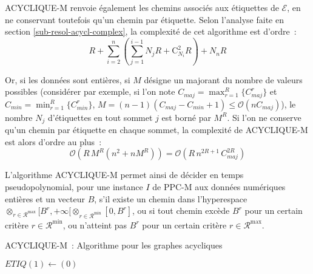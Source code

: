 \documentclass[10pt,francais]{llncs}
\begin{document}
{ACYCLIQUE-M  renvoie \'egalement les chemins associ\'es aux \'etiquettes de $\mathscr{E}$, en ne conservant toutefois qu'un chemin par \'etiquette. Selon l'analyse faite en section \ref{sub-resol-acycl-complex}, la complexit\'e de cet algorithme est d'ordre~: 
$$R + \sum_{i=2}^n \left(\sum_{j=1}^{i-1} N_j R + \textrm{C}^2_{N_i} R \right) + N_n R$$

Or, si les donn\'ees sont enti\`eres, si $M$ d\'esigne un majorant du nombre de valeurs possibles 
(consid\'erer par exemple, si l'on note $C_{maj}= \max_{r=1}^R \{C^r_{maj}\}$ et $C_{min}=\min_{r=1}^R \{C^r_{min}\}$, $M=(n-1)(C_{maj}-C_{min}+1)\leq \mathcal{O}(nC_{maj})$), le nombre $N_j$ d'\'etiquettes en tout sommet $j$ est born\'e par $M^R$. Si l'on ne conserve qu'un chemin par \'etiquette en chaque sommet, la complexit\'e de ACYCLIQUE-M est alors d'ordre au plus~:
$$\mathcal{O}\left(R\,M^R\left(n^2+nM^R\right)\right) = 
\mathcal{O}\left( R\, n^{2R+1}\, C_{maj}^{2R} \right)$$

L'algorithme ACYCLIQUE-M permet ainsi de d\'ecider en temps pseudopolynomial, pour une instance $I$ de PPC-M aux donn\'ees num\'eriques enti\`eres et un vecteur $B$, s'il existe un chemin dans l'hyperespace  
$\otimes_{r\in \mathscr{R}^{\max}}[B^r,+\infty[\otimes_{r\in \mathscr{R}^{\min}}[0,B^r]$, ou si tout chemin exc\`ede $B^r$ pour un certain crit\`ere $r\in \mathscr{R}^{\min}$, ou n'atteint pas $B^r$ pour un certain crit\`ere $r\in\mathscr{R}^{\max}$.

\begin{algorithm}\label{algo-acyclique-m}
\caption{ACYCLIQUE-M~: Algorithme pour les graphes acycliques}
\BlankLine
{}
\BlankLine
{}
$ETIQ(1) \leftarrow (0)$
\BlankLine
{}


\end{algorithm}}
\end{document}
